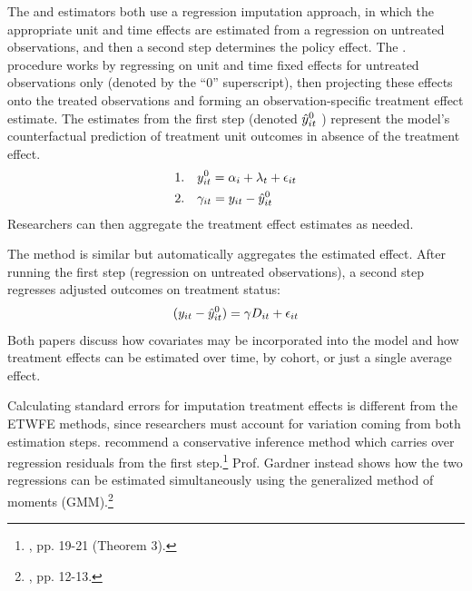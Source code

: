 \documentclass[12pt]{article}
\begin{document}
The \citet{borusyak2024revisiting} and \citet{gardner2022a} estimators both use a regression imputation approach, in which the appropriate unit and time effects are estimated from a regression on untreated observations, and then a second step determines the policy effect. The \citet{borusyak2024revisiting}. procedure works by regressing on unit and time fixed effects for untreated observations only (denoted by the “0” superscript), then projecting these effects onto the treated observations and forming an observation-specific treatment effect estimate. The estimates from the first step (denoted $\Hat{y}_{it}^0$ ) represent the model’s counterfactual prediction of treatment unit outcomes in absence of the treatment effect.
\begin{align}
    1. \quad & y_{it}^0 = \alpha_i + \lambda_t + \epsilon_{it} \\
    2. \quad & \gamma_{it} = y_{it} - \Hat{y}_{it}^0
\end{align}
Researchers can then aggregate the treatment effect estimates as needed.

The \citet{gardner2022a} method is similar but automatically aggregates the estimated effect. After running the first step (regression on untreated observations), a second step regresses adjusted outcomes on treatment status:
\begin{equation}
(y_{it} - \Hat{y}_{it}^0) = \gamma D_{it} + \epsilon_{it}    
\end{equation}
Both papers discuss how covariates may be incorporated into the model and how treatment effects can be estimated over time, by cohort, or just a single average effect.

Calculating standard errors for imputation treatment effects is different from the ETWFE methods, since researchers must account for variation coming from both estimation steps. \citet{borusyak2024revisiting} recommend a conservative inference method which carries over regression residuals from the first step.\footnote{\citet{borusyak2024revisiting}, pp. 19-21 (Theorem 3).}  Prof. Gardner instead shows how the two regressions can be estimated simultaneously using the generalized method of moments (GMM).\footnote{\citet{gardner2022a}, pp. 12-13.}
\end{document}
